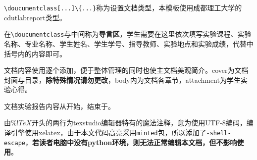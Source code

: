 \verb|\doucumentclass[...]\{...}|称为设置文档类型，本模板使用成都理工大学的cdutlabreport类型。

在\verb|\doucumentclass|与\verb||中间称为\textbf{导言区}，学生需要在这里依次填写实验课程、实验名称、专业名称、学生姓名、学生学号、指导教师、实验地点和实验成绩，代替中括号内的内容即可。

文档内容使用\verb||逐个添加，便于整体管理的同时也使主文档美观简介。cover为文档封面与目录，\textbf{除特殊情况请勿更改}，body内为文档各章节，attachment为学生实验心得。

文档实验报告内容从\verb||开始，结束于\verb||。

由$\% !TeX$开头的两行为texstudio编辑器特有的魔法注释，意为使用UTF-8编码，编译引擎使用xelatex，由于本文代码高亮采用\verb|minted|包，所以添加了\verb|-shell-escape|，\textbf{若读者电脑中没有python环境，则无法正常编辑本文档，但不影响使用}。